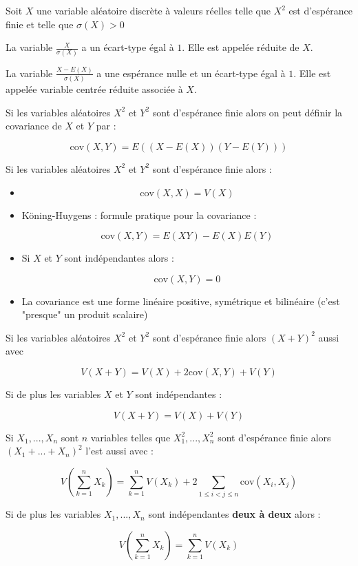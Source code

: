 \documentclass[a4paper,12pt]{book}
\newcommand{\Def}[2]{\begin{tcolorbox}[colback=white,colframe=red!10!green!20!blue!75!, title=Définition : #1]#2\end{tcolorbox}}
\newcommand{\Thr}[2]{\begin{tcolorbox}[sharp corners, colback=white,colframe=red!10!blue!30!green!75!, title=Théorème : #1]#2\end{tcolorbox}}
\begin{document}
\Def{}{Soit $X$ une variable aléatoire discrète à valeurs réelles telle que $X^2$ est d'espérance finie et telle que $\sigma(X)>0$
\par La variable $\frac{X}{\sigma(X)}$ a un écart-type égal à $1$. Elle est appelée réduite de $X$.
\par La variable $\frac{X-E(X)}{\sigma(X)}$ a une espérance nulle et un écart-type égal à $1$. Elle est appelée variable centrée réduite associée à $X$.}
\Def{}{Si les variables aléatoires $X^2$ et $Y^2$ sont d'espérance finie alors on peut définir la covariance de $X$ et $Y$ par :
\par $$\mathrm{cov}(X,Y)=E((X-E(X))(Y-E(Y)))$$}
\Thr{Propriétésde la covariance}{Si les variables aléatoires $X^2$ et $Y^2$ sont d'espérance finie alors :\begin{itemize}
\item $$\mathrm{cov}(X,X)=V(X)$$
\item Köning-Huygens : formule pratique pour la covariance :
\par $$\mathrm{cov}(X,Y)=E(XY)-E(X)E(Y)$$
\item Si $X$ et $Y$ sont indépendantes alors :
\par $$\mathrm{cov}(X,Y)=0$$
\item La covariance est une forme linéaire positive, symétrique et bilinéaire (c'est "presque" un produit scalaire)
\end{itemize}}
\Thr{Variance d'une somme}{Si les variables aléatoires $X^2$ et $Y^2$ sont d'espérance finie alors $(X+Y)^2$ aussi avec
\par $$V(X+Y)=V(X)+2\mathrm{cov}(X,Y)+V(Y)$$
\par Si de plus les variables $X$ et $Y$ sont indépendantes :
\par $$V(X+Y)=V(X)+V(Y)$$}
\Thr{Variance d'une somme}{Si $X_1,...,X_n$ sont $n$ variables telles que $X_1^2,..., X_n^2$ sont d'espérance finie alors $(X_1+...+X_n)^2$ l'est aussi avec :
\par $$V\left(\sum\limits_{k=1}^nX_k\right)=\sum\limits_{k=1}^nV(X_k)+2\sum\limits_{1\leq i<j\leq n}\mathrm{cov}(X_i, X_j)$$
\par Si de plus les variables $X_1,...,X_n$ sont indépendantes \textbf{deux à deux} alors :
\par $$V\left(\sum\limits_{k=1}^nX_k\right)=\sum\limits_{k=1}^nV(X_k)$$}
\end{document}

